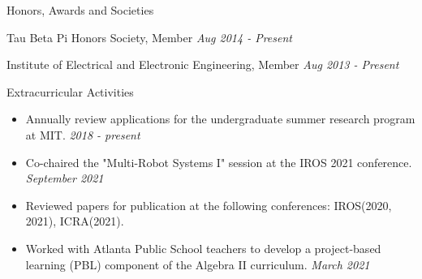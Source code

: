 \documentclass{resume} %
\begin{document}
\begin{rSection}{Honors, Awards and Societies}

\begin{rSubsection}{}{}{}{}
\item Tau Beta Pi Honors Society, Member \hfill {\em Aug 2014 - Present}
\item Institute of Electrical and Electronic Engineering, Member \hfill {\em Aug 2013 - Present}
\end{rSubsection}

\end{rSection}

\begin{rSection}{Extracurricular Activities}
\renewcommand\labelitemi{\raisebox{0.15ex}{$\cdot$}}
\begin{itemize}
\setlength{\itemindent}{-2.2em}

\item Annually review applications for the undergraduate summer research program at MIT.
\hfill {\em2018 - present}

\item Co-chaired the "Multi-Robot Systems I" session at the IROS 2021 conference. \hfill {\em September 2021}

\item Reviewed papers for publication at the following conferences: IROS(2020, 2021), ICRA(2021).

\item Worked with Atlanta Public School teachers to develop a project-based learning (PBL) component of the Algebra II curriculum. \hfill {\em March 2021}

\end{itemize}




\end{rSection}




\end{document}
